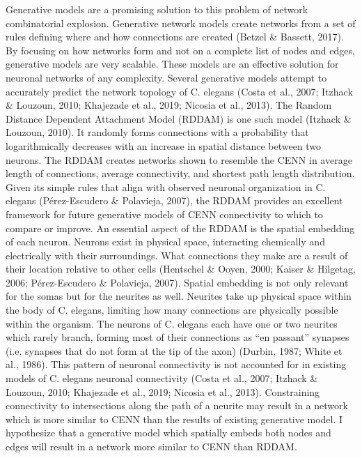 Generative models are a promising solution to this problem of network combinatorial explosion. Generative network models create networks from a set of rules defining where and how connections are created (Betzel \& Bassett, 2017). By focusing on how networks form and not on a complete list of nodes and edges, generative models are very scalable. These models are an effective solution for neuronal networks of any complexity. 
Several generative models attempt to accurately predict the network topology of C. elegans (Costa et al., 2007; Itzhack \& Louzoun, 2010; Khajezade et al., 2019; Nicosia et al., 2013). The Random Distance Dependent Attachment Model (RDDAM) is one such model (Itzhack \& Louzoun, 2010). It randomly forms connections with a probability that logarithmically decreases with an increase in spatial distance between two neurons. The RDDAM creates networks shown to resemble the CENN in average length of connections, average connectivity, and shortest path length distribution. Given its simple rules that align with observed neuronal organization in C. elegans (Pérez-Escudero \& Polavieja, 2007), the RDDAM provides an excellent framework for future generative models of CENN connectivity to which to compare or improve. An essential aspect of the RDDAM is the spatial embedding of each neuron. Neurons exist in physical space, interacting chemically and electrically with their surroundings. What connections they make are a result of their location relative to other cells (Hentschel \& Ooyen, 2000; Kaiser \& Hilgetag, 2006; Pérez-Escudero \& Polavieja, 2007). 
Spatial embedding is not only relevant for the somas but for the neurites as well. Neurites take up physical space within the body of C. elegans, limiting how many connections are physically possible within the organism. The neurons of C. elegans each have one or two neurites which rarely branch, forming most of their connections as “en passant” synapses (i.e. synapses that do not form at the tip of the axon) (Durbin, 1987; White et al., 1986). This pattern of neuronal connectivity is not accounted for in existing models of C. elegans neuronal connectivity (Costa et al., 2007; Itzhack \& Louzoun, 2010; Khajezade et al., 2019; Nicosia et al., 2013). Constraining connectivity to intersections along the path of a neurite may result in a network which is more similar to CENN than the results of existing generative model. I hypothesize that a generative model which spatially embeds both nodes and edges will result in a network more similar to CENN than RDDAM.
